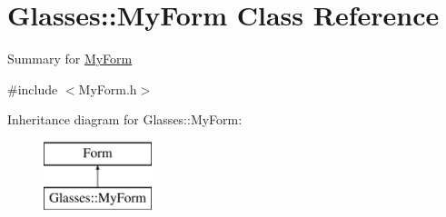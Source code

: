 \hypertarget{class_glasses_1_1_my_form}{}\section{Glasses\+:\+:My\+Form Class Reference}
\label{class_glasses_1_1_my_form}


Summary for \hyperlink{class_glasses_1_1_my_form}{My\+Form}  




{\ttfamily \#include $<$My\+Form.\+h$>$}

Inheritance diagram for Glasses\+:\+:My\+Form\+:\begin{figure}[H]
\begin{center}
\leavevmode
\includegraphics[height=2.000000cm]{class_glasses_1_1_my_form}
\end{center}
\end{figure}
